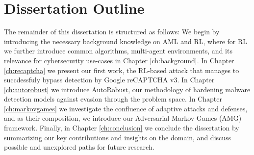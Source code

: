 


\section{Dissertation Outline}

The remainder of this dissertation is structured as follows:
We begin by introducing the necessary background knowledge on \gls{AML} and \gls{RL}, where for \gls{RL} we further introduce common algorithms, multi-agent environments, and its relevance for cybersecurity use-cases in Chapter \ref{ch:background}.
In Chapter \ref{ch:recaptcha} we present our first work, the RL-based attack that manages to succdessfuly bypass detection by Google reCAPTCHA v3.
In Chapter \ref{ch:autorobust} we introduce AutoRobust, our methodology of hardening malware detection models against evasion through the problem space.
In Chapter \ref{ch:markovgames} we investigate the confluence of adaptive attacks and defenses, and as their composition, we introduce our Adversarial Markov Games (AMG) framework.
Finally, in Chapter \ref{ch:conclusion} we conclude the dissertation by summarizing our key contributions and insights on the domain, and discuss possible and unexplored paths for future research.

\cleardoublepage

